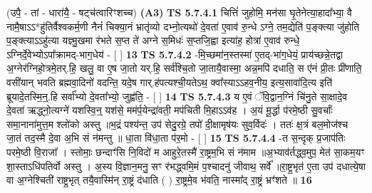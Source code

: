 \documentclass[17pt]{extarticle}
\begin{document}
                      (उपै॒ - तां - धारा॑यै॒ - षट्च॑त्वारिꣳशच्च)  \textbf{(A3)} \newline \newline
                                        \textbf{ TS 5.7.4.1} \newline
                  चित्तिं॑ जुहोमि॒ मन॑सा घृ॒तेनेत्या॒हादा᳚भ्या॒ वै नामै॒षाऽऽ*हु॑तिर्वैश्वकर्म॒णी नैनं॑ चिक्या॒नं भ्रातृ॑व्यो दभ्नो॒त्यथो॑ दे॒वता॑ ए॒वाव॑ रु॒न्धे ऽग्ने॒ तम॒द्येति॑ प॒ङ्क्त्या जु॑होति प॒ङ्क्त्याऽऽहु॑त्या यज्ञ्मु॒खमा र॑भते स॒प्त ते॑ अग्ने स॒मिधः॑ स॒प्तजि॒ह्वा इत्या॑ह॒ होत्रा॑ ए॒वाव॑ रुन्धे॒ ऽग्निर्दे॒वेभ्योऽपा᳚क्रामद्-भाग॒धेय॑ - [  ] \textbf{  13} \newline
                  \newline
                                \textbf{ TS 5.7.4.2} \newline
                  -मि॒च्छमा॑न॒स्तस्मा॑ ए॒तद्-भा॑ग॒धेयं॒ प्राय॑च्छन्ने॒तद्वा अ॒ग्नेर॑ग्निहो॒त्रमे॒तर्.हि॒ खलु॒ वा ए॒ष जा॒तो यर्.हि॒ सर्व॑श्चि॒तो जा॒तायै॒वास्मा॒ अन्न॒मपि॑ दधाति॒ स ए॑नं प्री॒तः प्री॑णाति॒ वसी॑यान् भवति ब्रह्मवा॒दिनो॑ वदन्ति॒ यदे॒ष गार्.ह॑पत्यश्ची॒यतेऽथ॒ क्वा᳚स्याऽऽहव॒नीय॒ इत्य॒सावा॑दि॒त्य इति॑ ब्रूयादे॒तस्मि॒न्॒.हि सर्वा᳚भ्यो दे॒वता᳚भ्यो॒ जुह्व॑ति॒ - [  ] \textbf{  14} \newline
                  \newline
                                \textbf{ TS 5.7.4.3} \newline
                  य ए॒वं ॅवि॒द्वान॒ग्निं चि॑नु॒ते सा॒क्षादे॒व दे॒वता॑ ऋद्ध्नो॒त्यग्ने॑ यशस्वि॒न्॒ यश॑से॒ मम॑र्प॒येन्द्रा॑वती॒ मप॑चिती मि॒हाऽऽव॑ह । अ॒यं मू॒र्द्धा प॑रमे॒ष्ठी सु॒वर्चाः᳚ समा॒नाना॑मुत्त॒म श्लो॑को अस्तु ॥भ॒द्रं पश्य॑न्त॒ उप॑ सेदु॒रग्रे॒ तपो॑ दी॒क्षामृष॑यः सुव॒र्विदः॑ । ततः॑ क्ष॒त्रं बल॒मोज॑श्च जा॒तं तद॒स्मै दे॒वा अ॒भि सं न॑मन्तु ॥ धा॒ता वि॑धा॒ता प॑र॒मो - [  ] \textbf{  15} \newline
                  \newline
                                \textbf{ TS 5.7.4.4} \newline
                  -त स॒न्दृक् प्र॒जाप॑तिः परमे॒ष्ठी वि॒राजा᳚ । स्तोमाः॒ छन्दाꣳ॑सि नि॒विदो॑ म आहुरे॒तस्मै॑ रा॒ष्ट्रम॒भि सं न॑माम ॥अ॒भ्याव॑र्तद्ध्व॒मुप॒ मेत॑ सा॒कम॒यꣳ शा॒स्ताऽधि॑पतिर्वो अस्तु । अ॒स्य वि॒ज्ञान॒मनु॒ सꣳ र॑भद्ध्वमि॒मं प॒श्चादनु॑ जीवाथ॒ सर्वे᳚ ॥रा॒ष्ट्र॒भृत॑ ए॒ता उप॑ दधात्ये॒षा वा अ॒ग्नेश्चिती॑ राष्ट्र॒भृत् तयै॒वास्मि॑न् रा॒ष्ट्रं द॑धाति ( ) रा॒ष्ट्रमे॒व भ॑वति॒ नास्मा᳚द् रा॒ष्ट्रं भ्रꣳ॑शते ॥ \textbf{  16} \newline
                  \newline
\end{document}
